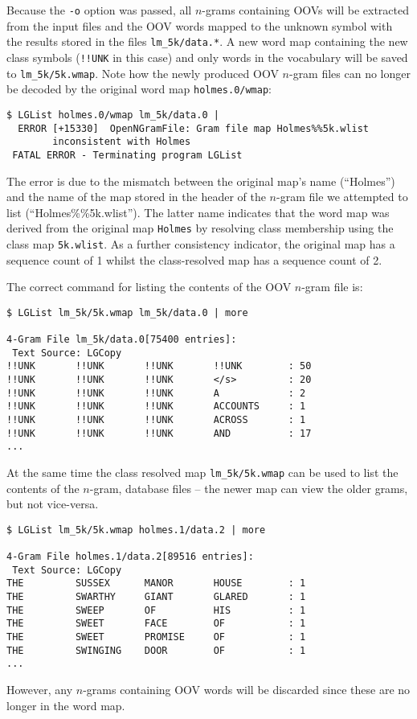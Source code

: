 Because the {\tt -o} option was passed, all $n$-grams containing OOVs
will be extracted from the input files and the OOV words mapped to the
unknown symbol with the results stored in the files
\texttt{lm\_5k/data.*}.  A new word map containing the new class
symbols (\texttt{!!UNK} in this case) and only words in the vocabulary
will be saved to \texttt{lm\_5k/5k.wmap}.  Note how the newly produced
OOV $n$-gram files can no longer be decoded by the original word map
\texttt{holmes.0/wmap}:
\begin{verbatim}
$ LGList holmes.0/wmap lm_5k/data.0 |
  ERROR [+15330]  OpenNGramFile: Gram file map Holmes%%5k.wlist 
        inconsistent with Holmes
 FATAL ERROR - Terminating program LGList
\end{verbatim} %
The error is due to the mismatch between the original map's name
(``Holmes'') and the name of the map stored in the header of the
$n$-gram file we attempted to list (``Holmes\%\%5k.wlist''). The latter
name indicates that the word map was derived from the original map
\texttt{Holmes} by resolving class membership using the class map
\texttt{5k.wlist}.  As a further consistency indicator, the original
map has a sequence count of 1 whilst the class-resolved map has a
sequence count of 2.

The correct command for listing the contents of the OOV $n$-gram
file is:
\begin{verbatim}
$ LGList lm_5k/5k.wmap lm_5k/data.0 | more

4-Gram File lm_5k/data.0[75400 entries]:
 Text Source: LGCopy
!!UNK       !!UNK       !!UNK       !!UNK        : 50
!!UNK       !!UNK       !!UNK       </s>         : 20
!!UNK       !!UNK       !!UNK       A            : 2
!!UNK       !!UNK       !!UNK       ACCOUNTS     : 1
!!UNK       !!UNK       !!UNK       ACROSS       : 1
!!UNK       !!UNK       !!UNK       AND          : 17
...
\end{verbatim} %

At the same time the class resolved map \texttt{lm\_5k/5k.wmap} can
be used to list the contents of the $n$-gram, database files -- the
newer map can view the older grams, but not vice-versa.
\begin{verbatim}
$ LGList lm_5k/5k.wmap holmes.1/data.2 | more

4-Gram File holmes.1/data.2[89516 entries]:
 Text Source: LGCopy
THE         SUSSEX      MANOR       HOUSE        : 1
THE         SWARTHY     GIANT       GLARED       : 1
THE         SWEEP       OF          HIS          : 1
THE         SWEET       FACE        OF           : 1
THE         SWEET       PROMISE     OF           : 1
THE         SWINGING    DOOR        OF           : 1
...
\end{verbatim} %
However, any $n$-grams containing OOV words will be discarded since
these are no longer in the word map.


